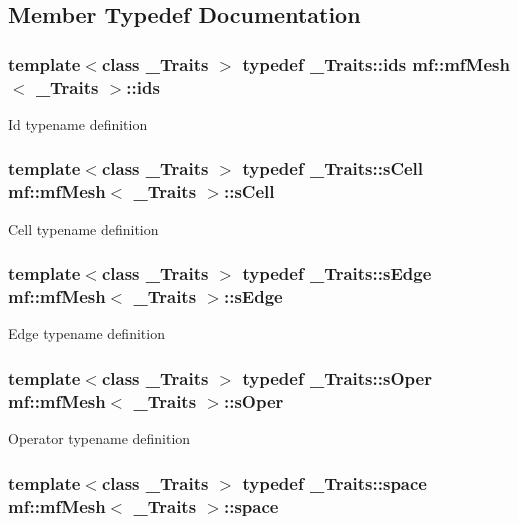 \subsection{Member Typedef Documentation}
\hypertarget{classmf_1_1mfMesh_a1341cfb4c31ef50c2cb5697b21b4b80e}{
\subsubsection[{ids}]{\setlength{\rightskip}{0pt plus 5cm}template$<$class \_\-Traits $>$ typedef \_\-Traits::ids {\bf mf::mfMesh}$<$ \_\-Traits $>$::{\bf ids}}}
\label{classmf_1_1mfMesh_a1341cfb4c31ef50c2cb5697b21b4b80e}
Id typename definition \hypertarget{classmf_1_1mfMesh_aef12414d31f355d46ead5ee4e6168048}{
\subsubsection[{sCell}]{\setlength{\rightskip}{0pt plus 5cm}template$<$class \_\-Traits $>$ typedef \_\-Traits::sCell {\bf mf::mfMesh}$<$ \_\-Traits $>$::{\bf sCell}}}
\label{classmf_1_1mfMesh_aef12414d31f355d46ead5ee4e6168048}
Cell typename definition \hypertarget{classmf_1_1mfMesh_a08b83de804f35261894bab4088146d0b}{
\subsubsection[{sEdge}]{\setlength{\rightskip}{0pt plus 5cm}template$<$class \_\-Traits $>$ typedef \_\-Traits::sEdge {\bf mf::mfMesh}$<$ \_\-Traits $>$::{\bf sEdge}}}
\label{classmf_1_1mfMesh_a08b83de804f35261894bab4088146d0b}
Edge typename definition \hypertarget{classmf_1_1mfMesh_ae5b6aa5ab4aa760861b9b5e26853d9d9}{
\subsubsection[{sOper}]{\setlength{\rightskip}{0pt plus 5cm}template$<$class \_\-Traits $>$ typedef \_\-Traits::sOper {\bf mf::mfMesh}$<$ \_\-Traits $>$::{\bf sOper}}}
\label{classmf_1_1mfMesh_ae5b6aa5ab4aa760861b9b5e26853d9d9}
Operator typename definition \hypertarget{classmf_1_1mfMesh_a6934f60ee28bc351e8a9b4cb0d80c3c9}{
\subsubsection[{space}]{\setlength{\rightskip}{0pt plus 5cm}template$<$class \_\-Traits $>$ typedef \_\-Traits::space {\bf mf::mfMesh}$<$ \_\-Traits $>$::{\bf space}}}
